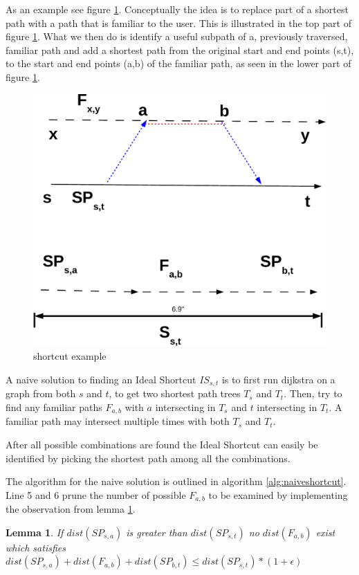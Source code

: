 \documentclass{article}
\newtheorem{lemma}{Lemma}
\begin{document}
As an example see figure \ref{fig:shortcutex}. Conceptually the idea is to 
replace part of a shortest path with a path that is familiar to the user. This 
is illustrated in the top part of figure \ref{fig:shortcutex}. 
What we then do is identify a useful subpath of a, previously traversed, familiar 
path and add a shortest path from the original start and end points (s,t), to the 
start and end points (a,b) of the familiar path, as seen in the lower part of figure
\ref{fig:shortcutex}.

\begin{figure}[Bht]\label{fig:shortcutex}
\center
\includegraphics[width=0.78\columnwidth]{figures/shortcut} 
\caption{shortcut example}
\end{figure}


A naive solution to finding an Ideal Shortcut $IS_{s,t}$ is to first run dijkstra 
on a graph from both $s$ and $t$, to get two shortest path trees $T_s$ and $T_t$. 
Then, try to find any familiar paths $F_{a,b}$ with $a$ intersecting in $T_s$ 
and $t$ intersecting in $T_t$. A familiar path may intersect multiple times with 
both $T_s$ and $T_t$.

After all possible combinations are found the Ideal Shortcut can easily be identified
by picking the shortest path among all the combinations.

The algorithm for the naive solution is outlined in algorithm \ref{alg:naiveshortcut}.
Line 5 and 6 prune the number of possible $F_{a,b}$ to be examined by implementing 
the observation from lemma \ref{lem:sacondition}.

\begin{lemma}\label{lem:sacondition}
If $dist(SP_{s,a})$ is greater than $dist(SP_{s,t})$ no $dist(F_{a,b})$ exist
which satisfies $dist(SP_{s,a}) + dist(F_{a,b}) + dist(SP_{b,t}) \leq dist(SP_{s,t}) \ast (1+\epsilon)$
\end{lemma}
\end{document}
